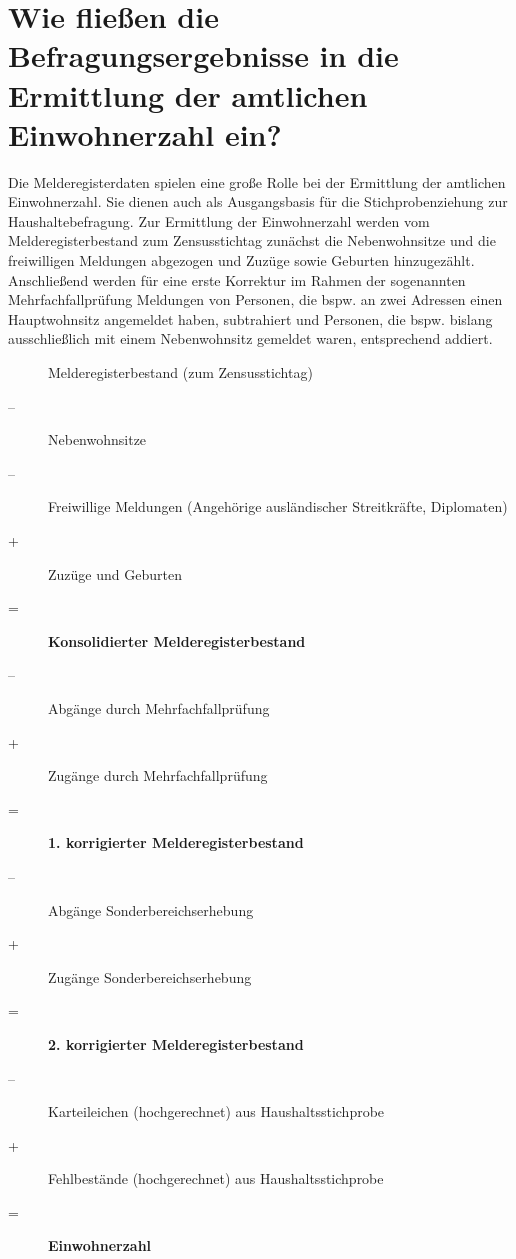 \section[Wie wird berechnet?]{Wie fließen die Befragungsergebnisse in die Ermittlung der amtlichen Einwohnerzahl ein?}
Die Melderegisterdaten spielen eine große Rolle bei der Ermittlung der amtlichen Einwohnerzahl. Sie dienen auch als Ausgangsbasis für die Stichprobenziehung zur Haushaltebefragung. Zur Ermittlung der Einwohnerzahl werden vom Melderegisterbestand zum Zensusstichtag zunächst die Nebenwohnsitze und die freiwilligen Meldungen abgezogen und Zuzüge sowie Geburten hinzugezählt. Anschließend werden für eine erste Korrektur im Rahmen der sogenannten Mehrfachfallprüfung Meldungen von Personen, die bspw. an zwei Adressen einen Hauptwohnsitz angemeldet haben, subtrahiert und Personen, die bspw. bislang ausschließlich mit einem Nebenwohnsitz gemeldet waren, entsprechend addiert.

\setlength{\parskip}{1pt}
\begin{description}
    \item[]Melderegisterbestand (zum Zensusstichtag)
    \item[--]Nebenwohnsitze
    \item[--]Freiwillige Meldungen (Angehörige ausländischer Streitkräfte, Diplomaten)
    \item[+]Zuzüge und Geburten
    \item[=]\textbf{Konsolidierter Melderegisterbestand}
    \item[--]Abgänge durch Mehrfachfallprüfung
    \item[+]Zugänge durch Mehrfachfallprüfung
    \item[=]\textbf{1. korrigierter Melderegisterbestand}
    \item[--]Abgänge Sonderbereichserhebung
    \item[+]Zugänge Sonderbereichserhebung
    \item[=]\textbf{2. korrigierter Melderegisterbestand}
    \item[--]Karteileichen (hochgerechnet) aus Haushaltsstichprobe
    \item[+]Fehlbestände (hochgerechnet) aus Haushaltsstichprobe
    \item[=]\textbf{Einwohnerzahl}
\end{description}
\setlength{\parskip}{\baselineskip}

